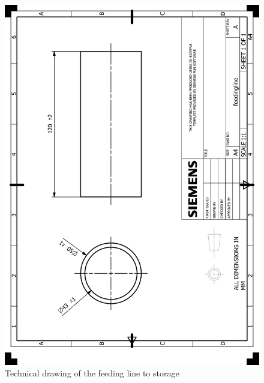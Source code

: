 \documentclass[12pt]{article}
\begin{document}
\begin{appendices}
\begin{figure}[H]
    \centering
    \includegraphics[width=\textwidth]{HP_feedingline.png} 
    \caption{Technical drawing of the feeding line to storage}
    \label{fig:technical-drawing}
\end{figure}


\end{appendices}
\end{document}
